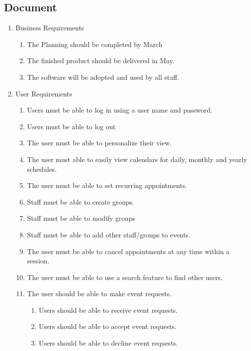 \documentclass[a4paper]{article}
\begin{document}
\subsection{Document}
\begin{enumerate}
  \item Business Requirements
  \begin{enumerate}[label=B\arabic*.]
    \item The Planning should be completed by March 
    \item The finished product should be delivered in May.
    \item The software will be adopted and used by all staff.
  \end{enumerate}

  \item User Requirements
  \begin{enumerate}[label=U\arabic*.] 
    \item Users must be able to log in using a user name and password.
    \item Users must be able to log out
    \item The user must be able to personalize their view.
    \item The user must able to easily view calendars for daily, monthly and yearly schedules.
    \item The user must be able to set recurring appointments.
    \item Staff must be able to create groups.
    \item Staff must be able to modify groups
    \item Staff must be able to add other staff/groups to events.
    \item The user must be able to cancel appointments at any time within a session.
    \item The user must be able to use a search feature to find other users.
    \item The user should be able to make event requests. 
    \begin{enumerate}[label*=\arabic*.]
      \item Users should be able to receive event requests.
      \item Users should be able to accept event requests.
      \item Users should be able to decline event requests.
    \end{enumerate}
  \end{enumerate}


\end{enumerate}
\end{document}
